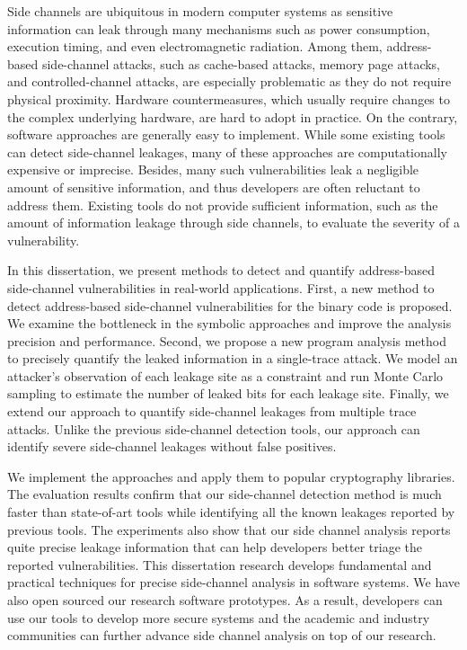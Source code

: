 
\vspace{-0.3in}
Side channels are ubiquitous in modern computer systems as sensitive
information can leak through many mechanisms such as power consumption, 
execution timing, and even electromagnetic radiation. Among them, 
address-based side-channel attacks, such as cache-based attacks, 
memory page attacks, and controlled-channel attacks, are especially
problematic as they do not require physical proximity. Hardware 
countermeasures, which usually require changes to the complex 
underlying hardware, are hard to adopt in practice.  On the contrary, 
software approaches are generally easy to implement. While some existing 
tools can detect side-channel leakages, many of these approaches are 
computationally expensive or imprecise. Besides, many such vulnerabilities 
leak a negligible amount of sensitive information, and thus developers 
are often reluctant to address them. Existing tools do not provide sufficient 
information, such as the amount of information leakage through side channels, 
to evaluate the severity of a vulnerability.

In this dissertation, we present methods to detect and quantify 
address-based side-channel vulnerabilities in real-world applications. 
First, a new method to detect address-based side-channel vulnerabilities 
for the binary code is proposed. We examine the bottleneck in the symbolic 
approaches and improve the analysis precision and performance.
Second, we propose a new program analysis method to precisely quantify
the leaked information in a single-trace attack. We model an
attacker’s observation of each leakage site as a constraint and run
Monte Carlo sampling to estimate the number of leaked bits for each
leakage site. Finally, we extend our approach to quantify side-channel 
leakages from multiple trace attacks.  Unlike the previous side-channel 
detection tools, our approach can identify severe side-channel
leakages without false positives. 

We implement the approaches and apply them to popular cryptography libraries.  
The evaluation results confirm that our side-channel detection method 
is much faster than state-of-art tools while identifying all the known leakages 
reported by previous tools.
The experiments also show that 
our side channel analysis reports quite precise leakage information
that can help developers better triage the reported vulnerabilities.
This dissertation research develops fundamental and practical techniques for precise side-channel 
analysis in software systems. We have also open sourced our research software prototypes.
As a result, developers can use our tools to develop more secure systems and the academic and industry
communities can further advance side channel analysis on top of our research.